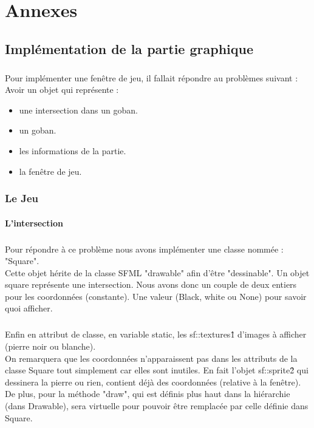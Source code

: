 \chapter{Annexes}\label{chap:annexes}
    \section{Implémentation de la partie graphique}
        \paragraph{}Pour implémenter une fenêtre de jeu, il fallait répondre au problèmes suivant :\\
        Avoir un objet qui représente :
        
        \begin{itemize}
            \item une intersection dans un goban.
            \item un goban.
            \item les informations de la partie.
            \item la fenêtre de jeu.
        \end{itemize}
        
        \subsection{Le Jeu}
            \subsubsection{L'intersection}
                \paragraph{}Pour répondre à ce problème nous avons implémenter une classe nommée : "Square".\\
                Cette objet hérite de la classe SFML "drawable" afin d'être "dessinable". 
                Un objet square représente une intersection. Nous avons donc un couple de deux entiers pour les coordonnées (constante). Une valeur (Black, white ou None) pour savoir quoi afficher. 
                
    	        \paragraph{}Enfin en attribut de classe, en variable static, les sf::textures\^1 d'images à afficher (pierre noir ou blanche). \\
    	        On remarquera que les coordonnées n'apparaissent pas dans les attributs de la classe Square tout simplement car elles sont inutiles. En fait l'objet sf::sprite\^2 qui dessinera la pierre ou rien, contient déjà des coordonnées (relative à la fenêtre). \\
    	        De plus, pour la méthode "draw", qui est définis plus haut dans la hiérarchie (dans Drawable), sera virtuelle pour pouvoir être remplacée par celle définie dans Square.
    	        
